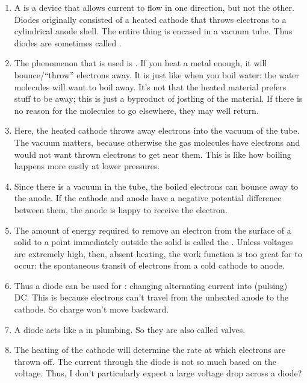 \documentclass[11pt, oneside]{amsart}
\begin{document}
\begin{enumerate}
  \item A  is a device that allows current to flow in one
  direction, but not the other. Diodes originally consisted of a heated
  cathode that throws electrons to a cylindrical anode shell. The entire
  thing is encased in a vacuum tube. Thus diodes are sometimes called
  .

  \item The phenomenon that is used is . If
  you heat a metal enough, it will bounce/``throw'' electrons away. It
  is just like when you boil water: the water molecules will want to
  boil away. It's not that the heated material prefers stuff to be away;
  this is just a byproduct of jostling of the material. If there is no
  reason for the molecules to go elsewhere, they may well return.

  \item Here, the heated cathode throws away electrons into the vacuum
  of the tube. The vacuum matters, because otherwise the gas molecules
  have electrons and would not want thrown electrons to get near them.
  This is like how boiling happens more easily at lower pressures.

  \item Since there is a vacuum in the tube, the boiled electrons can
  bounce away to the anode. If the cathode and anode have a negative
  potential difference between them, the anode is happy to receive the
  electron.

  \item The amount of energy required to remove an electron from the
  surface of a solid to a point immediately outside the solid is called
  the . Unless voltages are extremely high, then,
  absent heating, the work function is too great for  to occur: the spontaneous transit of electrons
  from a cold cathode to anode.

  \item Thus a diode can be used for : changing
  alternating current into (pulsing) DC. This is because electrons can't
  travel from the unheated anode to the cathode. So charge won't move
  backward.

  \item A diode acts like a  in plumbing. So they are also
  called valves.

  \item The heating of the cathode will determine the rate at which
  electrons are thrown off. The current through the diode is not so much
  based on the voltage. Thus, I don't particularly expect a large
  voltage drop across a diode?


\end{enumerate}
\end{document}

